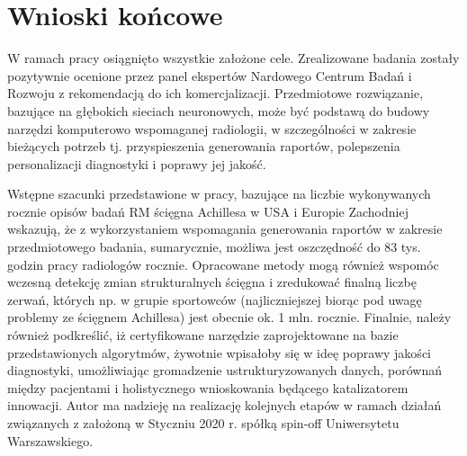 {\let\clearpage\relax\chapter*{Wnioski końcowe}}

W ramach pracy osiągnięto wszystkie założone cele. Zrealizowane badania zostały pozytywnie ocenione przez panel ekspertów Nardowego Centrum Badań i Rozwoju z rekomendacją do ich komercjalizacji. Przedmiotowe rozwiązanie, bazujące na głębokich sieciach neuronowych, może być podstawą do budowy narzędzi komputerowo wspomaganej radiologii, w szczególności w zakresie bieżących potrzeb tj. przyspieszenia generowania raportów, polepszenia personalizacji diagnostyki i poprawy jej jakość.

Wstępne szacunki przedstawione w pracy, bazujące na liczbie wykonywanych rocznie opisów badań RM ścięgna Achillesa w USA i Europie Zachodniej wskazują, że z wykorzystaniem wspomagania generowania raportów w zakresie przedmiotowego badania, sumarycznie, możliwa jest oszczędność do 83 tys. godzin pracy radiologów rocznie. Opracowane metody mogą również wspomóc wczesną detekcję zmian strukturalnych ścięgna i zredukować finalną liczbę zerwań, których np. w grupie sportowców (najliczniejszej biorąc pod uwagę problemy ze ścięgnem Achillesa) jest obecnie ok. 1 mln. rocznie. Finalnie, należy również podkreślić, iż certyfikowane narzędzie zaprojektowane na bazie przedstawionych algorytmów, żywotnie wpisałoby się w ideę poprawy jakości diagnostyki, umożliwiając gromadzenie ustrukturyzowanych danych, porównań między pacjentami i holistycznego wnioskowania będącego katalizatorem innowacji. Autor ma nadzieję na realizację kolejnych etapów w ramach działań związanych z założoną w Styczniu 2020 r. spółką spin-off Uniwersytetu Warszawskiego.
